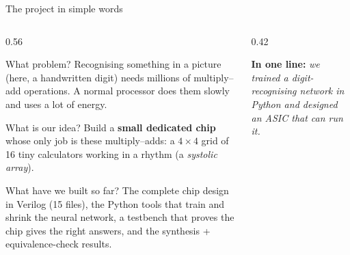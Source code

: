 \documentclass[aspectratio=169,10pt,t]{beamer}
\begin{document}
\begin{frame}{The project in simple words}
  \begin{columns}[T]
    \begin{column}{0.56\textwidth}
      \begin{block}{What problem?}
        \small Recognising something in a picture (here, a handwritten digit) needs millions of
        multiply--add operations. A normal processor does them slowly and uses a lot of energy.
      \end{block}
      \begin{block}{What is our idea?}
        \small Build a \textbf{small dedicated chip} whose only job is these multiply--adds:
        a $4\times4$ grid of 16 tiny calculators working in a rhythm (a \emph{systolic array}).
      \end{block}
      \begin{block}{What have we built so far?}
        \small The complete chip design in Verilog (15 files), the Python tools that train and
        shrink the neural network, a testbench that proves the chip gives the right answers,
        and the synthesis + equivalence-check results.
      \end{block}
    \end{column}
    \begin{column}{0.42\textwidth}
      \vspace{2pt}

      \footnotesize\textbf{In one line:} \emph{we trained a digit-recognising network in Python and designed an ASIC that can run it.}
    \end{column}
  \end{columns}
\end{frame}
\end{document}
